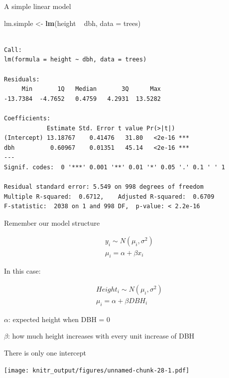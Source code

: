 \documentclass[10pt,ignorenonframetext,]{beamer}
\newenvironment{Shaded}{\begin{snugshade}}{\end{snugshade}}
\newcommand{\KeywordTok}[1]{\textcolor[rgb]{0.13,0.29,0.53}{\textbf{{#1}}}}
\newcommand{\DataTypeTok}[1]{\textcolor[rgb]{0.13,0.29,0.53}{{#1}}}
\newcommand{\StringTok}[1]{\textcolor[rgb]{0.31,0.60,0.02}{{#1}}}
\newcommand{\NormalTok}[1]{{#1}}
\begin{document}
\begin{frame}[fragile]{A simple linear model}

\begin{Shaded}
\begin{Highlighting}[]
\NormalTok{lm.simple <-}\StringTok{ }\KeywordTok{lm}\NormalTok{(height ~}\StringTok{ }\NormalTok{dbh, }\DataTypeTok{data =} \NormalTok{trees)}
\end{Highlighting}
\end{Shaded}

\begin{verbatim}

Call:
lm(formula = height ~ dbh, data = trees)

Residuals:
     Min       1Q   Median       3Q      Max 
-13.7384  -4.7652   0.4759   4.2931  13.5282 

Coefficients:
            Estimate Std. Error t value Pr(>|t|)    
(Intercept) 13.18767    0.41476   31.80   <2e-16 ***
dbh          0.60967    0.01351   45.14   <2e-16 ***
---
Signif. codes:  0 '***' 0.001 '**' 0.01 '*' 0.05 '.' 0.1 ' ' 1

Residual standard error: 5.549 on 998 degrees of freedom
Multiple R-squared:  0.6712,    Adjusted R-squared:  0.6709 
F-statistic:  2038 on 1 and 998 DF,  p-value: < 2.2e-16
\end{verbatim}

\end{frame}

\begin{frame}{Remember our model structure}

\[
  \begin{aligned}
  y_{i} \sim N(\mu_{i}, \sigma^2) \\ 
  \mu_{i} = \alpha + \beta x_{i} 
  \end{aligned}
\]

In this case:

\[
  \begin{aligned}
  Height_{i} \sim N(\mu_{i}, \sigma^2)  \\
  \mu_{i} = \alpha + \beta DBH_{i} 
  \end{aligned}
\]

\(\alpha\): expected height when DBH = 0

\(\beta\): how much height increases with every unit increase of DBH

\end{frame}

\begin{frame}{There is only one intercept}

\texttt{[image: knitr\_output/figures/unnamed-chunk-28-1.pdf]}

\end{frame}
\end{document}
